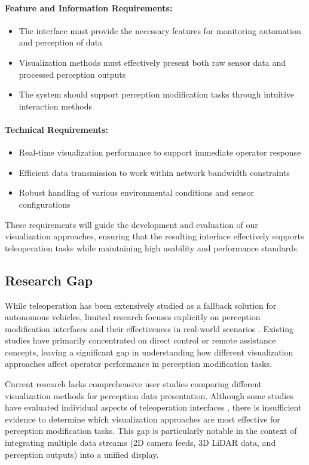 \paragraph{Feature and Information Requirements:}
\begin{itemize}
    \item The interface must provide the necessary features for monitoring automation and perception of data
    \item Visualization methods must effectively present both raw sensor data and processed perception outputs
    \item The system should support perception modification tasks through intuitive interaction methods
\end{itemize}
\paragraph{Technical Requirements:}
\begin{itemize}
    \item Real-time visualization performance to support immediate operator response
    \item Efficient data transmission to work within network bandwidth constraints
    \item Robust handling of various environmental conditions and sensor configurations
\end{itemize}

These requirements will guide the development and evaluation of our visualization approaches, ensuring that the resulting interface effectively supports teleoperation tasks while maintaining high usability and performance standards.
\subsection{Research Gap}

While teleoperation has been extensively studied as a fallback solution for autonomous vehicles, limited research focuses explicitly on perception modification interfaces and their effectiveness in real-world scenarios \cite{Georg}. Existing studies have primarily concentrated on direct control or remote assistance concepts, leaving a significant gap in understanding how different visualization approaches affect operator performance in perception modification tasks.

Current research lacks comprehensive user studies comparing different visualization methods for perception data presentation. Although some studies have evaluated individual aspects of teleoperation interfaces \cite{Kettwich}, there is insufficient evidence to determine which visualization approaches are most effective for perception modification tasks. This gap is particularly notable in the context of integrating multiple data streams (2D camera feeds, 3D LiDAR data, and perception outputs) into a unified display.

